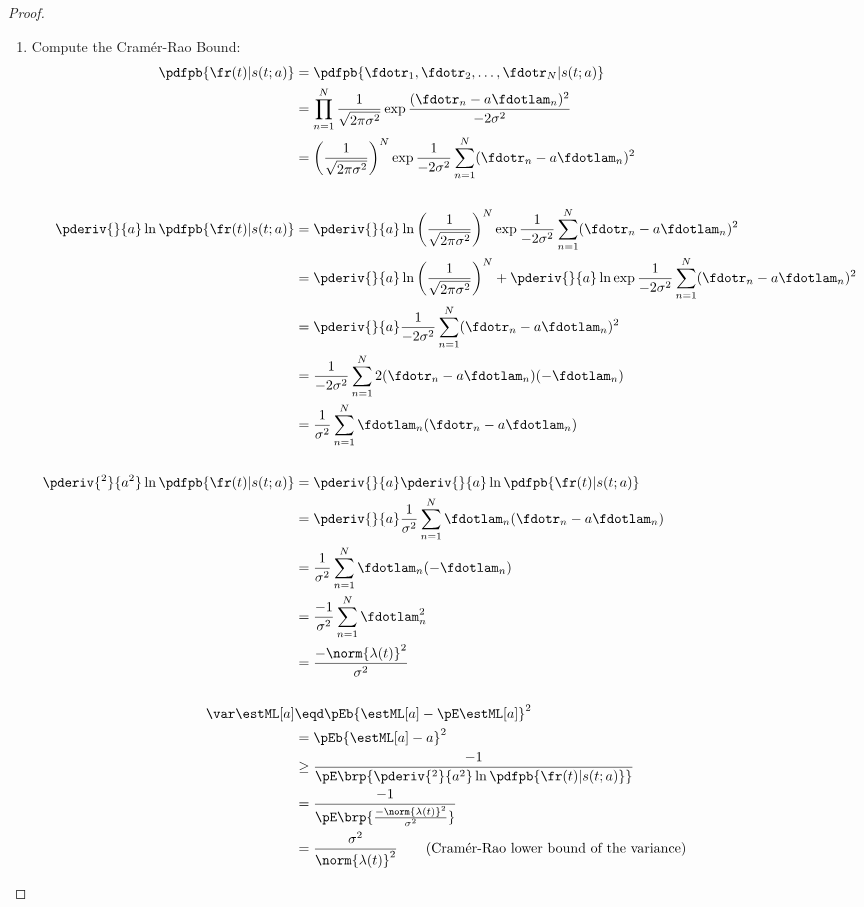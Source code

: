 {\begin{proof}
\begin{enumerate}
\item Compute the Cram\'er-Rao Bound:
\begin{align*}
   \pdfpb{\fr(t)|s(t; a)}
     &=  \pdfpb{\fdotr_1, \fdotr_2,\ldots,\fdotr_N|s(t; a)}
   \\&=  \prod_{n=1}^N \frac{1}{\sqrt{2\pi\sigma^2}}
          \exp{\frac{(\fdotr_n- a\fdotlam_n)^2}{-2\sigma^2}}
   \\&=  \left(\frac{1}{\sqrt{2\pi\sigma^2}}\right)^N
          \exp{\frac{1}{-2\sigma^2} \sum_{n=1}^N (\fdotr_n- a\fdotlam_n)^2}
\\
\\
   \pderiv{}{a}\ln\pdfpb{\fr(t)|s(t; a)}
     &=  \pderiv{}{a}\ln
          \left(\frac{1}{\sqrt{2\pi\sigma^2}}\right)^N
          \exp{\frac{1}{-2\sigma^2} \sum_{n=1}^N (\fdotr_n- a\fdotlam_n)^2}
   \\&=  \pderiv{}{a}\ln
          \left(\frac{1}{\sqrt{2\pi\sigma^2}}\right)^N
       +  \pderiv{}{a}\ln
          \exp{\frac{1}{-2\sigma^2} \sum_{n=1}^N (\fdotr_n- a\fdotlam_n)^2}
   \\&=  \pderiv{}{a}
          \frac{1}{-2\sigma^2} \sum_{n=1}^N (\fdotr_n- a\fdotlam_n)^2
   \\&=  \frac{1}{-2\sigma^2} \sum_{n=1}^N 2(\fdotr_n- a\fdotlam_n)(- \fdotlam_n)
   \\&=  \frac{1}{\sigma^2} \sum_{n=1}^N \fdotlam_n(\fdotr_n- a\fdotlam_n)
\\
\\
   \pderiv{^2}{a^2}\ln\pdfpb{\fr(t)|s(t; a)}
     &=  \pderiv{}{a}\pderiv{}{a}\ln\pdfpb{\fr(t)|s(t; a)}
   \\&=  \pderiv{}{a}
          \frac{1}{\sigma^2} \sum_{n=1}^N \fdotlam_n(\fdotr_n- a\fdotlam_n)
   \\&=  \frac{1}{\sigma^2} \sum_{n=1}^N \fdotlam_n(-\fdotlam_n)
   \\&=  \frac{-1}{\sigma^2} \sum_{n=1}^N \fdotlam_n^2
   \\&=  \frac{-\norm{\lambda(t)}^2}{\sigma^2}
\\
\\
   \var\estML[a]
     &\eqd \pEb{\estML[a]-\pE\estML[a]}^2
   \\&=    \pEb{\estML[a]- a}^2
   \\&\ge  \frac{-1}{\pE\brp{\pderiv{^2}{ a^2} \ln \pdfpb{\fr(t)|s(t; a)}}}
   \\&=    \frac{-1}{\pE\brp{\frac{-\norm{\lambda(t)}^2}{\sigma^2}}}
   \\&=    \frac{\sigma^2}{\norm{\lambda(t)}^2}
     \qquad\text{(Cram\'er-Rao lower bound of the variance)}
\end{align*}


\end{enumerate}
\end{proof}}
